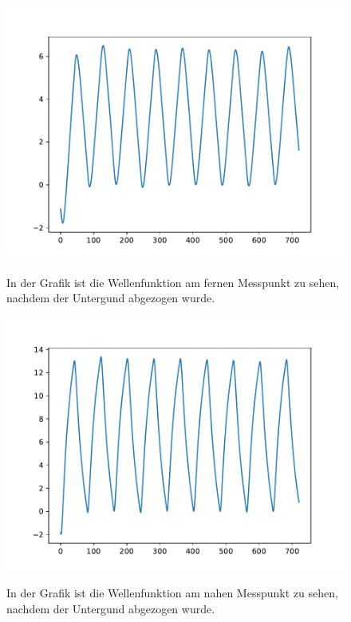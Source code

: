 \documentclass[titlepage = firstcover]{scrartcl}
\begin{document}
      \begin{figure}[h]
        \centering
        \caption{In der Grafik ist die Wellenfunktion am fernen Messpunkt zu sehen, nachdem der Untergund abgezogen wurde.}
        \includegraphics{AmpAluFern.pdf}
        \label{fig:AmpAluFern}
      \end{figure}

      \begin{figure}[h]
        \centering
        \caption{In der Grafik ist die Wellenfunktion am nahen Messpunkt zu sehen, nachdem der Untergund abgezogen wurde.}
        \includegraphics{AmpAluNah.pdf}
        \label{fig:AmpAluNah}
      \end{figure}
\end{document}
